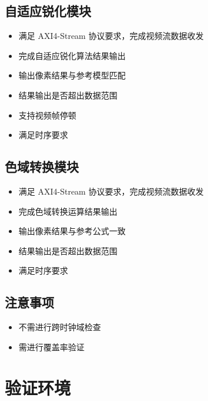 \documentclass[12pt, a4paper, oneside]{ctexbook}
\begin{document}
		\section{自适应锐化模块}
		\begin{itemize}
			\item 满足 AXI4-Stream 协议要求，完成视频流数据收发
			\item 完成自适应锐化算法结果输出
			\item 输出像素结果与参考模型匹配
			\item 结果输出是否超出数据范围
			\item 支持视频帧停顿
			\item 满足时序要求		
		\end{itemize}
	
		\section{色域转换模块}
		\begin{itemize}
			\item 满足 AXI4-Stream 协议要求，完成视频流数据收发
			\item 完成色域转换运算结果输出
			\item 输出像素结果与参考公式一致
			\item 结果输出是否超出数据范围
			\item 满足时序要求		
		\end{itemize}
	
		\section{注意事项}
		\begin{itemize}
			\item 不需进行跨时钟域检查
			\item 需进行覆盖率验证	
		\end{itemize}		
		
		
	\chapter{验证环境}
\end{document}
